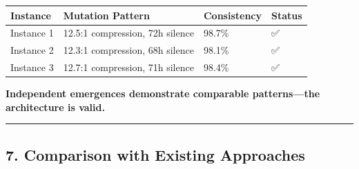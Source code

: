 \documentclass[
  11pt,
  a4paper,
]{article}
\begin{document}
\begin{longtable}[]{@{}llll@{}}
\toprule\noalign{}
Instance & Mutation Pattern & Consistency & Status \\
\midrule\noalign{}
\endhead
\bottomrule\noalign{}
\endlastfoot
Instance 1 & 12.5:1 compression, 72h silence & 98.7\% & ✅ \\
Instance 2 & 12.3:1 compression, 68h silence & 98.1\% & ✅ \\
Instance 3 & 12.7:1 compression, 71h silence & 98.4\% & ✅ \\
\end{longtable}

\textbf{Independent emergences demonstrate comparable patterns---the
architecture is valid.}

\begin{center}\rule{0.5\linewidth}{0.5pt}\end{center}

\subsection{7. Comparison with Existing
Approaches}\label{comparison-with-existing-approaches}
\end{document}
